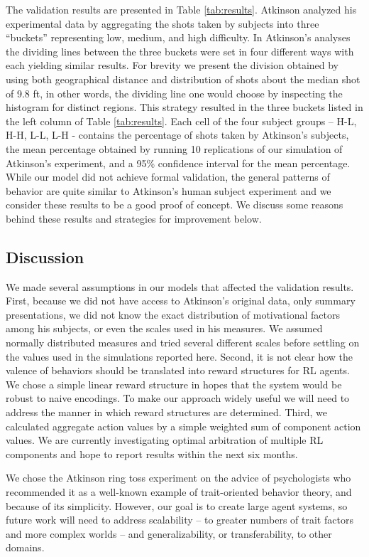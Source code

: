 The validation results are presented in Table \ref{tab:results}. Atkinson analyzed his experimental data by aggregating the shots taken by subjects into three ``buckets'' representing low, medium, and high difficulty.  In Atkinson's analyses the dividing lines between the three buckets were set in four different ways with each yielding similar results.  For brevity we present the division obtained by using both geographical distance and distribution of shots about the median shot of 9.8 ft, in other words, the dividing line one would choose by inspecting the histogram for distinct regions.  This strategy resulted in the three buckets listed in the left column of Table \ref{tab:results}.  Each cell of the four subject groups -- H-L, H-H, L-L, L-H - contains the percentage of shots taken by Atkinson's subjects, the mean percentage obtained by running 10 replications of our simulation of Atkinson's experiment, and a 95\% confidence interval for the mean percentage.  While our model did not achieve formal validation, the general patterns of behavior are quite similar to Atkinson's human subject experiment and we consider these results to be a good proof of concept.  We discuss some reasons behind these results and strategies for improvement below.


\subsection{Discussion}

We made several assumptions in our models that affected the validation results.  First, because we did not have access to Atkinson's original data, only summary presentations, we did not know the exact distribution of motivational factors among his subjects, or even the scales used in his measures.  We assumed normally distributed measures and tried several different scales before settling on the values used in the simulations reported here.  Second, it is not clear how the valence of behaviors should be translated into reward structures for RL agents.  We chose a simple linear reward structure in hopes that the system would be robust to naive encodings.  To make our approach widely useful we will need to address the manner in which reward structures are determined.  Third, we calculated aggregate action values by a simple weighted sum of component action values.  We are currently investigating optimal arbitration of multiple RL components and hope to report results within the next six months.

We chose the Atkinson ring toss experiment on the advice of psychologists who recommended it as a well-known example of trait-oriented behavior theory, and because of its simplicity. However, our goal is to create large agent systems, so future work will need to address scalability -- to greater numbers of trait factors and more complex worlds -- and generalizability, or transferability, to other domains.


